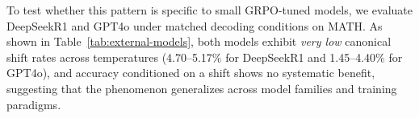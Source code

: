 To test whether this pattern is specific to small GRPO-tuned models, we evaluate DeepSeek\textendash R1 and GPT\textendash 4o under matched decoding conditions on \textsc{MATH}. As shown in Table~\ref{tab:external-models}, both models exhibit \emph{very low} canonical shift rates across temperatures (4.70--5.17\% for DeepSeek\textendash R1 and 1.45--4.40\% for GPT\textendash 4o), and accuracy conditioned on a shift shows no systematic benefit, suggesting that the phenomenon generalizes across model families and training paradigms.
